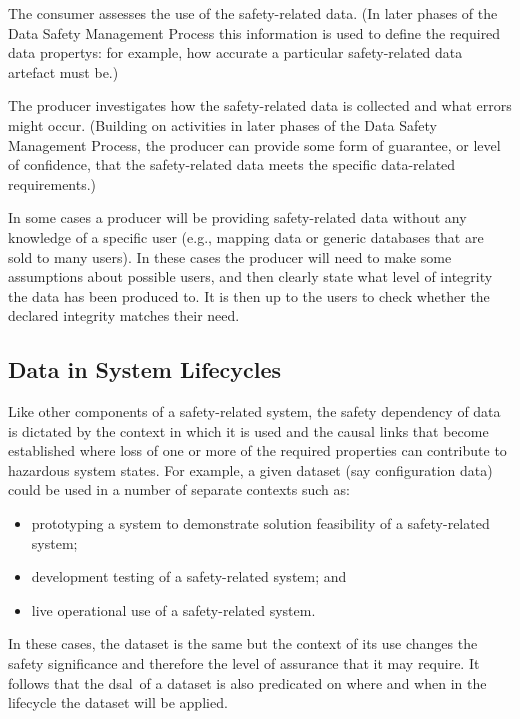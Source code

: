 The consumer assesses the use of the safety-related data. (In later phases of the Data Safety Management Process this \gls{information} is used to define the required \glspl{data property}: for example, how accurate a particular safety-related \gls{data artefact} must be.)

The producer investigates how the safety-related data is collected and what errors might occur. (Building on activities in later phases of the Data Safety Management Process, the producer can provide some form of guarantee, or level of confidence, that the safety-related data meets the specific data-related requirements.)

In some cases a producer will be providing safety-related data without any knowledge of a specific user (e.g., mapping data or generic \glspl{database} that are sold to many users). In these cases the producer will need to make some assumptions about possible users, and then clearly state what level of \gls{integrity} the data has been produced to. It is then up to the users to check whether the declared \gls{integrity} matches their need.

\subsection{Data in System Lifecycles}
Like other components of a safety-related system, the safety dependency of data is dictated by the context in which it is used and the causal links that become established where loss of one or more of the required properties can contribute to hazardous system states. For example, a given \gls{dataset} (say \gls{configuration data}) could be used in a number of separate contexts such as:
\begin{itemize}
  \item prototyping a system to demonstrate solution feasibility of a safety-related system;
  \item development testing of a safety-related system; and
  \item live operational use of a safety-related system.
\end{itemize}

In these cases, the \gls{dataset} is the same but the context of its use changes the safety significance and therefore the level of assurance that it may require. It follows that the \cbstart\gls{dsal}\cbend\ of a \gls{dataset} is also predicated on where and when in the lifecycle the \gls{dataset} will be applied. 

